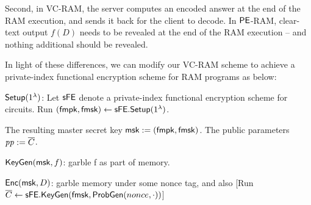 {Second, in VC-RAM, the server computes an encoded answer 
at the end of the RAM execution, and sends it back for the client
to decode.
In ${\sf PE}$-RAM, clear-text output $f(D)$ needs to be revealed at the
end of the RAM execution -- and nothing additional 
should be revealed.

In light of these differences, we can modify our VC-RAM scheme
to achieve a private-index functional encryption scheme for RAM programs
as below:

\begin{description}
\item
$\mathsf{Setup}(1^\lambda)$:
Let ${\sf sFE}$ denote a private-index functional encryption scheme 
for circuits.
Run $(\mathsf{fmpk}, \mathsf{fmsk}) \leftarrow {\sf sFE}.\mathsf{Setup}(1^\lambda)$.

The resulting master secret key ${\sf msk} := (\mathsf{fmpk}, \mathsf{fmsk})$. The public parameters ${\it pp}:=\overline{C}$.
\item
$\mathsf{KeyGen}({\sf msk}, f)$:
garble f as part of memory.
\item
${\sf Enc}({\sf msk}, D)$:
garble memory under some nonce tag, and also 
[Run $\overline{C} \leftarrow {\sf sFE}.\mathsf{KeyGen}(\mathsf{fmsk}, \mathsf{ProbGen}(nonce, \cdot))$]
\end{description}

}


